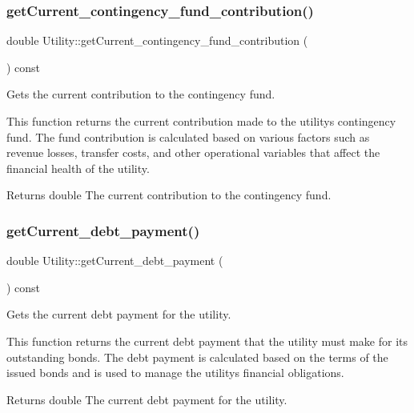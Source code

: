 \subsubsection{\texorpdfstring{get\+Current\+\_\+contingency\+\_\+fund\+\_\+contribution()}{getCurrent\_contingency\_fund\_contribution()}}
{\footnotesize\ttfamily double Utility\+::get\+Current\+\_\+contingency\+\_\+fund\+\_\+contribution (\begin{DoxyParamCaption}{ }\end{DoxyParamCaption}) const}



Gets the current contribution to the contingency fund. 

This function returns the current contribution made to the utility\textquotesingle{}s contingency fund. The fund contribution is calculated based on various factors such as revenue losses, transfer costs, and other operational variables that affect the financial health of the utility.

\begin{DoxyReturn}{Returns}
double The current contribution to the contingency fund. 
\end{DoxyReturn}
\mbox{\label{classUtility_ab0e6984f9bad9d5d2a756f015216f54f}} 
\subsubsection{\texorpdfstring{get\+Current\+\_\+debt\+\_\+payment()}{getCurrent\_debt\_payment()}}
{\footnotesize\ttfamily double Utility\+::get\+Current\+\_\+debt\+\_\+payment (\begin{DoxyParamCaption}{ }\end{DoxyParamCaption}) const}



Gets the current debt payment for the utility. 

This function returns the current debt payment that the utility must make for its outstanding bonds. The debt payment is calculated based on the terms of the issued bonds and is used to manage the utility\textquotesingle{}s financial obligations.

\begin{DoxyReturn}{Returns}
double The current debt payment for the utility. 
\end{DoxyReturn}
\mbox{\label{classUtility_a407debda53abcf80ebd290414c1bf5bc}} 
